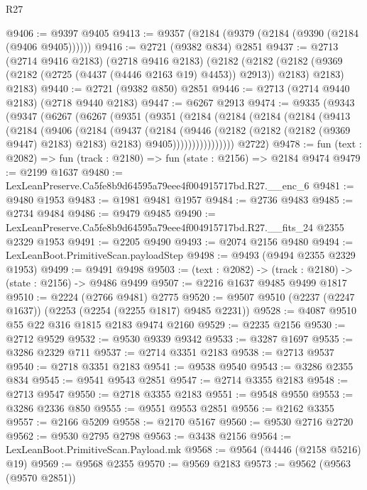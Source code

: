 \begin{lexlean}{R27}
\begin{coremodule}
@9406 := @9397 @9405
@9413 := @9357 (@2184 (@9379 (@2184 (@9390 (@2184 (@9406 @9405))))))
@9416 := @2721 (@9382 @834) @2851
@9437 := @2713
    (@2714 @9416 @2183)
    (@2718 @9416 @2183)
    (@2182
      (@2182 (@2182 (@9369 (@2182 (@2725 (@4437 (@4446 @2163 @19) @4453)) @2913)) @2183) @2183)
      @2183)
@9440 := @2721 (@9382 @850) @2851
@9446 := @2713 (@2714 @9440 @2183) (@2718 @9440 @2183)
@9447 := @6267 @2913
@9474 := @9335
    (@9343
      (@9347
        (@6267
          (@6267
            (@9351
              (@9351
                (@2184
                  (@2184
                    (@2184
                      (@2184
                        (@9413
                          (@2184
                            (@9406
                              (@2184
                                (@9437
                                  (@2184
                                    (@9446
                                      (@2182 (@2182 (@2182 (@9369 @9447) @2183) @2183) @2183)
                                      @9405))))))))))))))))
      @2722)
@9478 := fun (text : @2082) => fun (track : @2180) => fun (state : @2156) => @2184 @9474
@9479 := @2199 @1637
@9480 := LexLeanPreserve.Ca5fe8b9d64595a79eee4f004915717bd.R27.__enc_6
@9481 := @9480 @1953
@9483 := @1981 @9481 @1957
@9484 := @2736 @9483
@9485 := @2734 @9484
@9486 := @9479 @9485
@9490 := LexLeanPreserve.Ca5fe8b9d64595a79eee4f004915717bd.R27.__fits_24 @2355 @2329 @1953
@9491 := @2205 @9490
@9493 := @2074 @2156 @9480
@9494 := LexLeanBoot.PrimitiveScan.payloadStep
@9498 := @9493 (@9494 @2355 @2329 @1953)
@9499 := @9491 @9498
@9503 := (text : @2082) -> (track : @2180) -> (state : @2156) -> @9486 @9499
@9507 := @2216 @1637 @9485 @9499 @1817
@9510 := @2224 (@2766 @9481) @2775
@9520 := @9507 @9510 (@2237 (@2247 @1637)) (@2253 (@2254 (@2255 @1817) @9485 @2231))
@9528 := @4087 @9510 @55 @22 @316 @1815 @2183 @9474 @2160
@9529 := @2235 @2156
@9530 := @2712 @9529
@9532 := @9530 @9339 @9342
@9533 := @3287 @1697
@9535 := @3286 @2329 @711
@9537 := @2714 @3351 @2183
@9538 := @2713 @9537
@9540 := @2718 @3351 @2183
@9541 := @9538 @9540
@9543 := @3286 @2355 @834
@9545 := @9541 @9543 @2851
@9547 := @2714 @3355 @2183
@9548 := @2713 @9547
@9550 := @2718 @3355 @2183
@9551 := @9548 @9550
@9553 := @3286 @2336 @850
@9555 := @9551 @9553 @2851
@9556 := @2162 @3355
@9557 := @2166 @5209
@9558 := @2170 @5167
@9560 := @9530 @2716 @2720
@9562 := @9530 @2795 @2798
@9563 := @3438 @2156
@9564 := LexLeanBoot.PrimitiveScan.Payload.mk
@9568 := @9564 (@4446 (@2158 @5216) @19)
@9569 := @9568 @2355
@9570 := @9569 @2183
@9573 := @9562 (@9563 (@9570 @2851))

\end{coremodule}
\end{lexlean}
